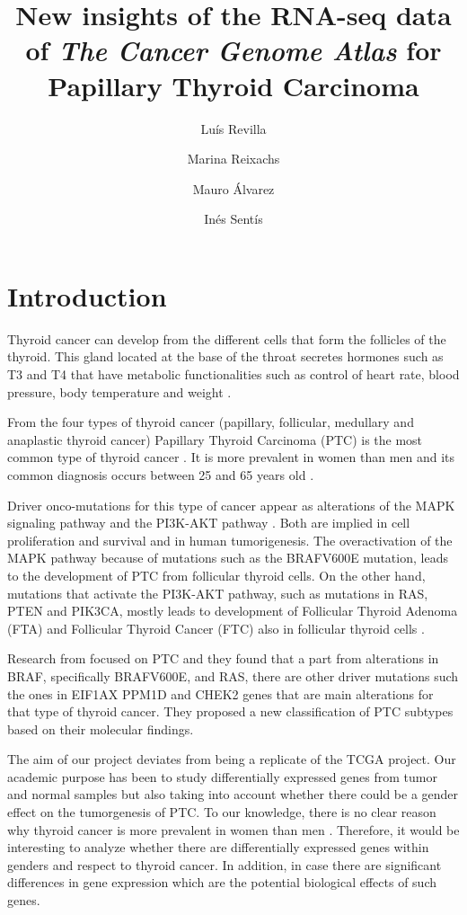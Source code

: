 \documentclass[9pt,twocolumn,twoside]{gsajnl}
\title{New insights of the RNA-seq data of \textit{The Cancer Genome Atlas} for Papillary Thyroid Carcinoma}
\author[$\ast$,1]{Luís Revilla}
\author[$\ast$]{Marina Reixachs}
\author[$\ast$]{Mauro Álvarez}
\author[$\ast$]{Inés Sentís}
\affil[$\ast$]{Universitat Pompeu Fabra}
\begin{document}
\maketitle
\thispagestyle{firststyle}
\marginmark
\firstpagefootnote
{}
\vspace{-11pt}%


\section*{Introduction}

Thyroid cancer can develop from the different cells that form the follicles of the thyroid. This gland located at the base of the throat secretes hormones such as T3 and T4 that have metabolic functionalities such as control of heart rate, blood pressure, body temperature and weight \citep{tcga}.

From the four types of thyroid cancer (papillary, follicular, medullary and anaplastic thyroid cancer) Papillary Thyroid Carcinoma (PTC) is the most common type of thyroid cancer \citep{Agrawal2014a}. It is more prevalent in women than men and its common diagnosis occurs between 25 and 65 years old \citep{risk}.

Driver onco-mutations for this type of cancer appear as alterations of the MAPK signaling pathway and the PI3K-AKT pathway \citep{Kimura2003}. Both are implied in cell proliferation and survival and in human tumorigenesis. The overactivation of the MAPK pathway because of mutations such as the BRAFV600E mutation, leads to the development of PTC from follicular thyroid cells. On the other hand, mutations that activate the PI3K-AKT pathway, such as mutations in RAS, PTEN and PIK3CA, mostly leads to development of Follicular Thyroid Adenoma (FTA) and Follicular Thyroid Cancer (FTC) also in follicular thyroid cells \citep{Xing2013a}.

Research from \citet{tcga} focused on PTC and they found that a part from alterations in BRAF, specifically BRAFV600E, and RAS, there are other driver mutations such the ones in EIF1AX PPM1D and CHEK2 genes that are main alterations for that type of thyroid cancer. They proposed a new classification of PTC subtypes based on their molecular findings. 

The aim of our project deviates from being a replicate of the TCGA project. Our academic purpose has been to study differentially expressed genes from tumor and normal samples but also taking into account whether there could be a gender effect on the tumorgenesis of PTC. To our knowledge, there is no clear reason why thyroid cancer is more prevalent in women than men \citep{intro}. Therefore, it would be interesting to analyze whether there are differentially expressed genes within genders and respect to thyroid cancer. In addition, in case there are significant differences in gene expression which are the potential biological effects of such genes. 
\end{document}

